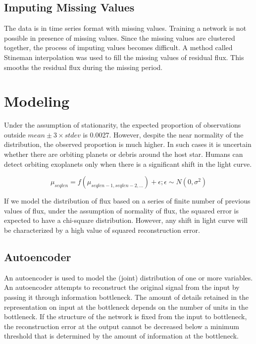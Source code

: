 \documentclass[%
aip,
amsmath,amssymb,
reprint,%
]{revtex4-1}
\begin{document}
\subsection{Imputing Missing Values}

The data is in time series format with missing values. Training a network is not possible in presence of missing values. Since the missing values are clustered together, the process of imputing values becomes difficult. A method called Stineman interpolation was used to fill the missing values of residual flux. This smooths the residual flux during the missing period.

\section{Modeling}

Under the assumption of stationarity, the expected proportion of observations outside $mean \pm 3 \times stdev$ is 0.0027. However, despite the near normality of the distribution, the observed proportion is much higher. In such cases it is uncertain whether there are orbiting planets or debris around the host star. Humans can detect orbiting exoplanets only when there is a significant shift in the light curve.

$$\mu_{seqlen} = f(\mu_{seqlen-1,seqlen-2, ...}) + \epsilon; \epsilon \sim N(0, \sigma^2)$$

If we model the distribution of flux based on a series of finite number of previous values of flux, under the assumption of normality of flux, the squared error is expected to have a chi-square distribution. However, any shift in light curve will be characterized by a high value of squared reconstruction error.

\subsection{Autoencoder}

An autoencoder is used to model the (joint) distribution of one or more variables. An autoencoder attempts to reconstruct the original signal from the input by passing it through information bottleneck. The amount of details retained in the representation on input at the bottleneck depends on the number of units in the bottleneck. If the structure of the network is fixed from the input to bottleneck, the reconstruction error at the output cannot be decreased below a minimum threshold that is determined by the amount of information at the bottleneck.
\end{document}
